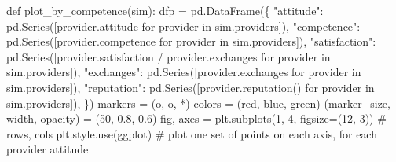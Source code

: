 \documentclass[
  letterpaper,
  DIV=11,
  numbers=noendperiod]{scrartcl}
\newenvironment{Shaded}{\begin{snugshade}}{\end{snugshade}}
\newcommand{\CommentTok}[1]{\textcolor[rgb]{0.37,0.37,0.37}{#1}}
\newcommand{\ControlFlowTok}[1]{\textcolor[rgb]{0.00,0.23,0.31}{#1}}
\newcommand{\DecValTok}[1]{\textcolor[rgb]{0.68,0.00,0.00}{#1}}
\newcommand{\FloatTok}[1]{\textcolor[rgb]{0.68,0.00,0.00}{#1}}
\newcommand{\KeywordTok}[1]{\textcolor[rgb]{0.00,0.23,0.31}{#1}}
\newcommand{\NormalTok}[1]{\textcolor[rgb]{0.00,0.23,0.31}{#1}}
\newcommand{\OperatorTok}[1]{\textcolor[rgb]{0.37,0.37,0.37}{#1}}
\newcommand{\StringTok}[1]{\textcolor[rgb]{0.13,0.47,0.30}{#1}}
\begin{document}
\begin{Shaded}
\begin{Highlighting}[]
\KeywordTok{def}\NormalTok{ plot\_by\_competence(sim):}
\NormalTok{    dfp }\OperatorTok{=}\NormalTok{ pd.DataFrame(\{}
        \StringTok{"attitude"}\NormalTok{: pd.Series([provider.attitude }\ControlFlowTok{for}\NormalTok{ provider }\KeywordTok{in}\NormalTok{ sim.providers]),}
        \StringTok{"competence"}\NormalTok{: pd.Series([provider.competence }\ControlFlowTok{for}\NormalTok{ provider }\KeywordTok{in}\NormalTok{ sim.providers]),}
        \StringTok{"satisfaction"}\NormalTok{: pd.Series([provider.satisfaction }\OperatorTok{/}\NormalTok{ provider.exchanges }
                              \ControlFlowTok{for}\NormalTok{ provider }\KeywordTok{in}\NormalTok{ sim.providers]),}
        \StringTok{"exchanges"}\NormalTok{: pd.Series([provider.exchanges }\ControlFlowTok{for}\NormalTok{ provider }\KeywordTok{in}\NormalTok{ sim.providers]),}
        \StringTok{"reputation"}\NormalTok{: pd.Series([provider.reputation() }\ControlFlowTok{for}\NormalTok{ provider }\KeywordTok{in}\NormalTok{ sim.providers]),}
\NormalTok{    \})}
\NormalTok{    markers }\OperatorTok{=}\NormalTok{ (}\StringTok{\textquotesingle{}o\textquotesingle{}}\NormalTok{, }\StringTok{\textquotesingle{}o\textquotesingle{}}\NormalTok{, }\StringTok{\textquotesingle{}*\textquotesingle{}}\NormalTok{)}
\NormalTok{    colors }\OperatorTok{=}\NormalTok{ (}\StringTok{\textquotesingle{}red\textquotesingle{}}\NormalTok{, }\StringTok{\textquotesingle{}blue\textquotesingle{}}\NormalTok{, }\StringTok{\textquotesingle{}green\textquotesingle{}}\NormalTok{)}
\NormalTok{    (marker\_size, width, opacity) }\OperatorTok{=}\NormalTok{ (}\DecValTok{50}\NormalTok{, }\FloatTok{0.8}\NormalTok{, }\FloatTok{0.6}\NormalTok{)}
\NormalTok{    fig, axes }\OperatorTok{=}\NormalTok{ plt.subplots(}\DecValTok{1}\NormalTok{, }\DecValTok{4}\NormalTok{, figsize}\OperatorTok{=}\NormalTok{(}\DecValTok{12}\NormalTok{, }\DecValTok{3}\NormalTok{)) }\CommentTok{\# rows, cols}
\NormalTok{    plt.style.use(}\StringTok{\textquotesingle{}ggplot\textquotesingle{}}\NormalTok{)}
    \CommentTok{\# plot one set of points on each axis, for each provider attitude}
    

\end{Highlighting}
\end{Shaded}
\end{document}
